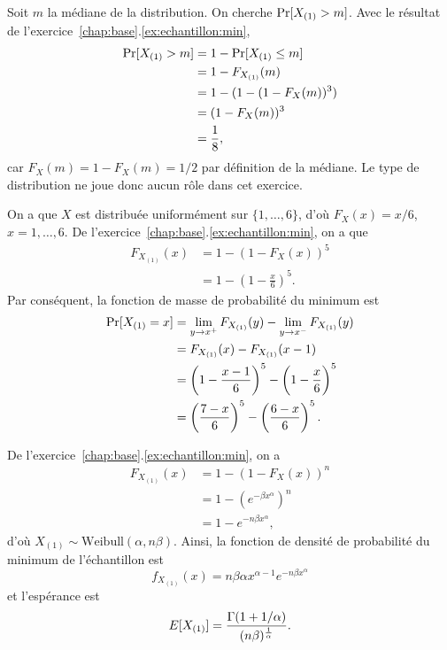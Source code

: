 \begin{solution}{1.13}
    Soit $m$ la médiane de la distribution. On cherche $\mathrm{Pr} [ X_{(1)}
      > m ]$. Avec le résultat de
    l'exercice~\ref{chap:base}.\ref{ex:echantillon:min},
    \begin{align*}
      \mathrm{Pr} [ X_{(1)} > m ]
      &= 1 - \mathrm{Pr} [ X_{(1)} \leq m ] \\
      &= 1 - F_{X_{(1)}}(m) \\
      &= 1 - (1 - (1 - F_X(m))^3)\\
      &= (1 - F_X(m))^3 \\
      &= \frac{1}{8},
    \end{align*}
    car $F_X(m) = 1 - F_X(m) = 1/2$ par définition de la médiane. Le
    type de distribution ne joue donc aucun rôle dans cet exercice.
  
\end{solution}
\begin{solution}{1.14}
    On a que $X$ est distribuée uniformément sur $\{1, \dots, 6\}$,
    d'où $F_X(x) = x/6$, $x = 1, \dots, 6$. De
    l'exercice~\ref{chap:base}.\ref{ex:echantillon:min}, on a
    que
    \begin{align*}
      F_{X_{(1)}}(x)
      &= 1 - (1 - F_X(x))^5 \\
      &= 1 - \left( 1 - \frac{x}{6} \right)^5.
    \end{align*}
    Par conséquent, la fonction de masse de probabilité du minimum est
    \begin{align*}
      \mathrm{Pr} [ X_{(1)} = x ]
      &= \lim_{y \rightarrow x^+} F_{X_{(1)}}(y) -
      \lim_{y \rightarrow x^-} F_{X_{(1)}}(y) \\
      &= F_{X_{(1)}}(x) - F_{X_{(1)}}(x - 1) \\
      &= \left(1 - \frac{x-1}{6} \right)^5 -
      \bigg( 1 - \frac{x}{6} \bigg)^5 \\
      &= \left(\frac{7 - x}{6}\right)^5 -
      \left(\frac{6 - x}{6}\right)^5.
    \end{align*}
  
\end{solution}
\begin{solution}{1.15}
    De l'exercice~\ref{chap:base}.\ref{ex:echantillon:min}, on
    a
    \begin{align*}
      F_{X_{(1)}}(x)
      &= 1 - (1 - F_X(x))^n \\
      &= 1 - (e^{-\beta x^\alpha})^n \\
      &= 1 - e^{-n \beta x^\alpha},
    \end{align*}
    d'où $X_{(1)} \sim \text{Weibull}(\alpha, n \beta)$. Ainsi, la fonction de densité de probabilité du minimum de
    l'échantillon est
    \begin{equation*}
      f_{X_{(1)}}(x) = n \beta \alpha x^{\alpha - 1} e^{-n \beta x^\alpha}
    \end{equation*}
    et l'espérance est
    \begin{equation*}
      E [ X_{(1)} ] = \frac{\Gamma(1 + 1/\alpha)}{(n \beta)^{\frac{1}{\alpha}}}.
    \end{equation*}
  
\end{solution}
